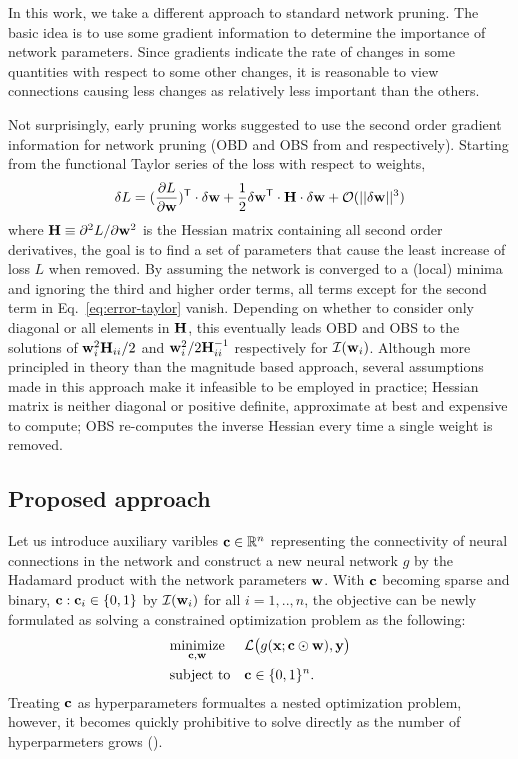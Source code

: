 {In this work, we take a different approach to standard network pruning.
The basic idea is to use some gradient information to determine the importance of network parameters.
Since gradients indicate the rate of changes in some quantities with respect to some other changes, it is reasonable to view connections causing less changes as relatively less important than the others.

Not surprisingly, early pruning works suggested to use the second order gradient information for network pruning (OBD and OBS from \cite{lecun1990optimal} and \cite{hassibi1993optimal} respectively).
Starting from the functional Taylor series of the loss with respect to weights,
\begin{equation}
    \delta L = (\frac{\partial L}{\partial {\mathbf{w}}})^\mathsf{T} \cdot \delta {\mathbf{w}} + \frac{1}{2} \delta {\mathbf{w}}^\mathsf{T} \cdot {\mathbf{H}} \cdot \delta {\mathbf{w}} + \mathcal{O}(||\delta{\mathbf{w}} ||^{3})
    \label{eq:error-taylor}
\end{equation}
where ${\mathbf{H}} \equiv \partial^{2}L/\partial{\mathbf{w}}^{2}$ is the Hessian matrix containing all second order derivatives, the goal is to find a set of parameters that cause the least increase of loss $L$ when removed.
By assuming the network is converged to a (local) minima and ignoring the third and higher order terms, all terms except for the second term in Eq.~\ref{eq:error-taylor} vanish.
Depending on whether to consider only diagonal or all elements in ${\mathbf{H}}$, this eventually leads OBD and OBS to the solutions of ${\mathbf{w}}^{2}_{i}{\mathbf{H}}_{ii}/2$ and ${{\mathbf{w}}^{2}_{i}}/{2{\mathbf{H}}^{-1}_{ii}}$ respectively for $\mathcal{I}({\mathbf{w}}_i)$.
Although more principled in theory than the magnitude based approach, several assumptions made in this approach make it infeasible to be employed in practice;
Hessian matrix is neither diagonal or positive definite, approximate at best and expensive to compute; \eg OBS re-computes the inverse Hessian every time a single weight is removed.


\subsection{Proposed approach}

Let us introduce auxiliary varibles ${\mathbf{c}} \in {\mathbb{R}}^{n}$ representing the connectivity of neural connections in the network and construct a new neural network $g$ by the Hadamard product with the network parameters ${\mathbf{w}}$.
With ${\mathbf{c}}$ becoming sparse and binary, \ie ${\mathbf{c}}: {\mathbf{c}}_i \in \{0, 1\}$ by $\mathcal{I}({\mathbf{w}}_i)$ for all $i=1,..,n$, the objective can be newly formulated as solving a constrained optimization problem as the following:
\begin{equation}
    \begin{aligned}
        & \underset{{\mathbf{c}}, {\mathbf{w}}}{\text{minimize}} & & \mathcal{L}\big( g({\mathbf{x}}; {\mathbf{c}} \odot {\mathbf{w}}), {\mathbf{y}} \big) \\
        & \text{subject to} & & {\mathbf{c}} \in \{0, 1\}^{n}.
    \end{aligned}
\end{equation}
Treating ${\mathbf{c}}$ as hyperparameters formualtes a nested optimization problem, however, it becomes quickly prohibitive to solve directly as the number of hyperparmeters grows (\cite{hazan2017hyperparameter}).

}
